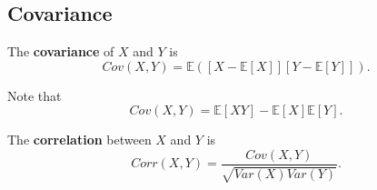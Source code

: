 \subsection{Covariance}

\begin{definition}
  The {\bf covariance} of $X$ and $Y$ is
  \[Cov(X, Y) = \mathbb{E}([X - \mathbb{E}[X]][Y-\mathbb{E}[Y]]).\]
\end{definition}

\begin{remark}
    Note that
    \[Cov(X,Y) = \mathbb{E}[XY] - \mathbb{E}[X]\mathbb{E}[Y].\]
\end{remark}

\begin{definition}
  The {\bf correlation} between $X$ and $Y$ is
  \[Corr(X,Y) = \frac{Cov(X,Y)}{\sqrt{Var(X) Var(Y)}}.\]
\end{definition}

